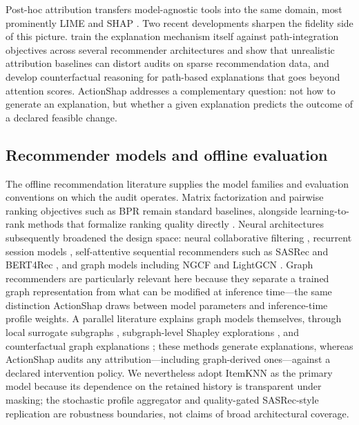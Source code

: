 \documentclass[a4paper,fleqn,doubleblind]{cas-sc}
\begin{document}
Post-hoc attribution transfers model-agnostic tools into the same domain, most prominently LIME \citep{ribeiro2016} and SHAP \citep{lundberg2017}. Two recent developments sharpen the fidelity side of this picture. \citet{barkan2026spinrec} train the explanation mechanism itself against path-integration objectives across several recommender architectures and show that unrealistic attribution baselines can distort audits on sparse recommendation data, and \citet{li2024tkde} develop counterfactual reasoning for path-based explanations that goes beyond attention scores. ActionShap addresses a complementary question: not how to generate an explanation, but whether a given explanation predicts the outcome of a declared feasible change.

\subsection{Recommender models and offline evaluation}
The offline recommendation literature supplies the model families and evaluation conventions on which the audit operates. Matrix factorization \citep{koren2009} and pairwise ranking objectives such as BPR \citep{rendle2009} remain standard baselines, alongside learning-to-rank methods that formalize ranking quality directly \citep{joachims2002,burges2005}. Neural architectures subsequently broadened the design space: neural collaborative filtering \citep{he2017ncf}, recurrent session models \citep{hidasi2016gru4rec}, self-attentive sequential recommenders such as SASRec \citep{kang2018sasrec} and BERT4Rec \citep{sun2019bert4rec}, and graph models including NGCF \citep{wang2019ngcf} and LightGCN \citep{he2020lightgcn}. Graph recommenders are particularly relevant here because they separate a trained graph representation from what can be modified at inference time---the same distinction ActionShap draws between model parameters and inference-time profile weights. A parallel literature explains graph models themselves, through local surrogate subgraphs \citep{ying2019gnnexplainer,luo2020pgexplainer}, subgraph-level Shapley explorations \citep{yuan2021subgraphx,duval2021graphsvx}, and counterfactual graph explanations \citep{lucic2022cfgnnexplainer}; these methods generate explanations, whereas ActionShap audits any attribution---including graph-derived ones---against a declared intervention policy. We nevertheless adopt ItemKNN as the primary model because its dependence on the retained history is transparent under masking; the stochastic profile aggregator and quality-gated SASRec-style replication are robustness boundaries, not claims of broad architectural coverage.
\end{document}
